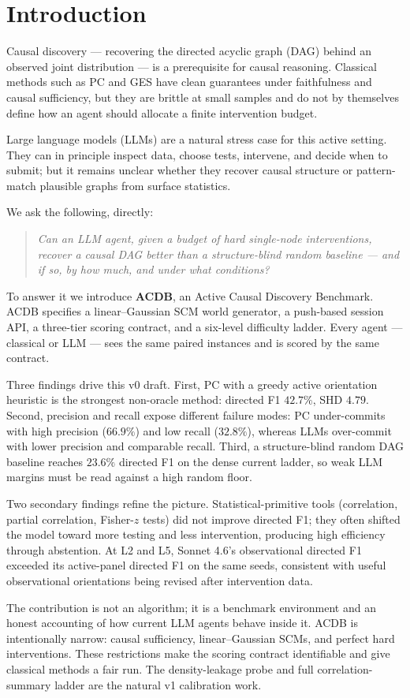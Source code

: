 \section{Introduction}
\label{sec:introduction}

Causal discovery --- recovering the directed acyclic graph (DAG) behind an observed joint distribution --- is a prerequisite for causal reasoning. Classical methods such as PC and GES have clean guarantees under faithfulness and causal sufficiency, but they are brittle at small samples and do not by themselves define how an agent should allocate a finite intervention budget.

Large language models (LLMs) are a natural stress case for this active setting. They can in principle inspect data, choose tests, intervene, and decide when to submit; but it remains unclear whether they recover causal structure or pattern-match plausible graphs from surface statistics.

We ask the following, directly:
\begin{quote}
\emph{Can an LLM agent, given a budget of hard single-node interventions, recover a causal DAG better than a structure-blind random baseline --- and if so, by how much, and under what conditions?}
\end{quote}

To answer it we introduce \textbf{ACDB}, an Active Causal Discovery Benchmark. ACDB specifies a linear--Gaussian SCM world generator, a push-based session API, a three-tier scoring contract, and a six-level difficulty ladder. Every agent --- classical or LLM --- sees the same paired instances and is scored by the same contract.

Three findings drive this v0 draft. First, PC with a greedy active orientation heuristic is the strongest non-oracle method: directed F1 $42.7\%$, SHD $4.79$. Second, precision and recall expose different failure modes: PC under-commits with high precision ($66.9\%$) and low recall ($32.8\%$), whereas LLMs over-commit with lower precision and comparable recall. Third, a structure-blind random DAG baseline reaches $23.6\%$ directed F1 on the dense current ladder, so weak LLM margins must be read against a high random floor.

Two secondary findings refine the picture. Statistical-primitive tools (correlation, partial correlation, Fisher-$z$ tests) did not improve directed F1; they often shifted the model toward more testing and less intervention, producing high efficiency through abstention. At L2 and L5, Sonnet 4.6's observational directed F1 exceeded its active-panel directed F1 on the same seeds, consistent with useful observational orientations being revised after intervention data.

The contribution is not an algorithm; it is a benchmark environment and an honest accounting of how current LLM agents behave inside it. ACDB is intentionally narrow: causal sufficiency, linear--Gaussian SCMs, and perfect hard interventions. These restrictions make the scoring contract identifiable and give classical methods a fair run. The density-leakage probe and full correlation-summary ladder are the natural v1 calibration work.
